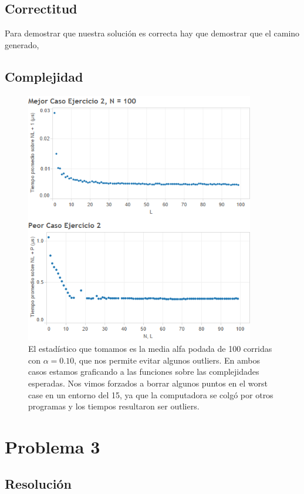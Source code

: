 \documentclass{article}
\theoremstyle{definition}
\theoremstyle{remark}
\begin{document}
\subsection{Correctitud}
Para demostrar que nuestra solución es correcta hay que demostrar que el camino generado, 

\subsection{Complejidad}



\begin{figure}[h!]
\centering
\includegraphics[width=10cm]{ex2}
\caption{El estadístico que tomamos es la media alfa podada de 100 corridas con $\alpha = 0.10$, que nos permite evitar algunos outliers. En ambos casos estamos graficando a las funciones sobre las complejidades esperadas. Nos vimos forzados a borrar algunos puntos en el worst case en un entorno del 15, ya que la computadora se colgó por otros programas y los tiempos resultaron ser outliers.\label{grf:ex2}}
\end{figure}

\pagebreak

\section{Problema 3}

\subsection{Resolución}
\end{document}
